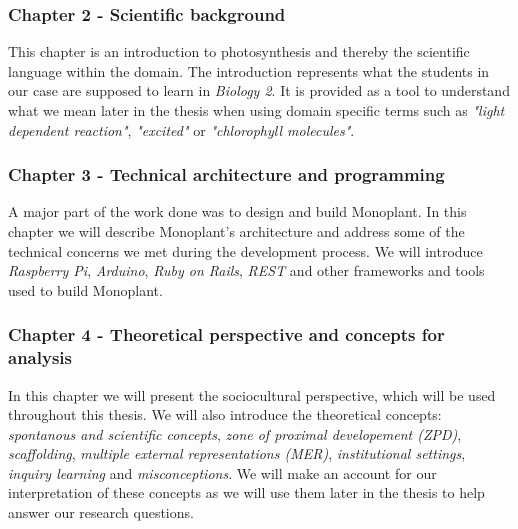 \subsubsection*{Chapter 2 - Scientific background}
This chapter is an introduction to photosynthesis and thereby the scientific language within the domain. The introduction represents what the students in our case are supposed to learn in \emph{Biology 2}. It is provided as a tool to understand what we mean later in the thesis when using domain specific terms such as \emph{"light dependent reaction"}, \emph{"excited"} or \emph{"chlorophyll molecules"}.

\subsubsection*{Chapter 3 - Technical architecture and programming}
A major part of the work done was to design and build Monoplant. In this chapter we will describe Monoplant's architecture and address some of the technical concerns we met during the development process. We will introduce \emph{Raspberry Pi}, \emph{Arduino}, \emph{Ruby on Rails}, \emph{REST} and other frameworks and tools used to build Monoplant.

\subsubsection*{Chapter 4 - Theoretical perspective and concepts for analysis}

In this chapter we will present the sociocultural perspective, which will be used throughout this thesis. We will also introduce the theoretical concepts: \emph{spontanous and scientific concepts}, \emph{zone of proximal developement (ZPD)}, \emph{scaffolding}, \emph{multiple external representations (MER)}, \emph{institutional settings}, \emph{inquiry learning} and \emph{misconceptions}. We will make an account for our interpretation of these concepts as we will use them later in the thesis to help answer our research questions. 

